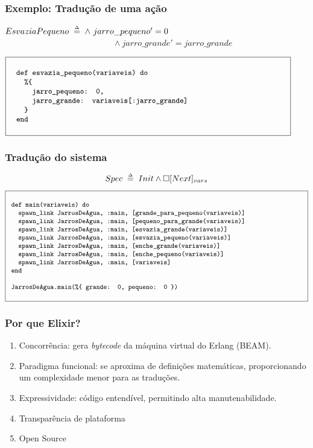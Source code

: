 \documentclass{beamer}
\begin{document}
\begin{frame}
  \frametitle{Exemplo: Tradução de uma ação}
  $EsvaziaPequeno \;\mathrel{\smash {{\stackrel{\scriptscriptstyle\Delta}{=}}}}\; \land\ jarro\_pequeno' = 0$\\
  ~~~~~~~~~~~~~~~~~~~~~~~~~~$\land\ jarro\_grande' = jarro\_grande$\\\medskip

  $\progfig{
  ~~def esvazia\_pequeno(variaveis) do\\
  ~~~~\%\{\\
  ~~~~~~jarro\_pequeno: 0,\\
  ~~~~~~jarro\_grande: variaveis[:jarro\_grande]\\
  ~~~~\}\\
  ~~end
  }$
\end{frame}

\begin{frame}
  \frametitle{Tradução do sistema}
  \[Spec \;\mathrel{\smash {{\stackrel{\scriptscriptstyle\Delta}{=}}}}\; Init \land \square [Next]_{vars}\]
  \hspace{-10mm}
  $\progfigbig{
  ~def main(variaveis) do\\
  ~~~spawn\_link JarrosDeAgua, :main, [grande\_para\_pequeno(variaveis)]\\
  ~~~spawn\_link JarrosDeAgua, :main, [pequeno\_para\_grande(variaveis)]\\
  ~~~spawn\_link JarrosDeAgua, :main, [esvazia\_grande(variaveis)]\\
  ~~~spawn\_link JarrosDeAgua, :main, [esvazia\_pequeno(variaveis)]\\
  ~~~spawn\_link JarrosDeAgua, :main, [enche\_grande(variaveis)]\\
  ~~~spawn\_link JarrosDeAgua, :main, [enche\_pequeno(variaveis)]\\
  ~~~spawn\_link JarrosDeAgua, :main, [variaveis]\\
  ~end\\\\
  ~JarrosDeAgua.main(\%\{\ grande: 0, pequeno: 0 \})
  }$
\end{frame}

\begin{frame}
  \frametitle{Por que Elixir?}

  \begin{enumerate}
    \item Concorrência: gera \textit{bytecode} da máquina virtual do Erlang (BEAM).

    \item Paradigma funcional: se aproxima de definições matemáticas, proporcionando um complexidade menor para as traduções.

    \item Expressividade: código entendível, permitindo alta manutenabilidade.

    \item Transparência de plataforma

    \item Open Source

  \end{enumerate}
\end{frame}
\end{document}
